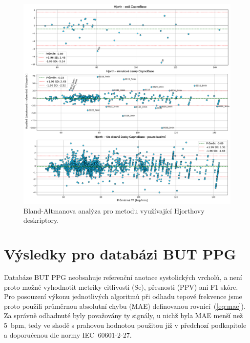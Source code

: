 \begin{figure}[!ht]
	\centering
	\includegraphics[width=1\textwidth]{./obrazky/vysledky/BlandAltman_CB_Hjorth.png}
	\caption[Bland-Altmanova analýza pro metodu využívající Hjorthovy deskriptory - CapnoBase]{Bland-Altmanova analýza pro metodu využívající Hjorthovy deskriptory.}
	\label{fig:capnobase_BlandAltman_hjorth}
\end{figure}

\FloatBarrier
\section{Výsledky pro databázi BUT PPG}
\label{sec:vysledky_butppg}
Databáze \acs{BUT PPG} neobsahuje referenční anotace systolických vrcholů, a není proto možné vyhodnotit metriky citlivosti (\acs{Se}), přesnosti (\acs{PPV}) ani F1 skóre.
Pro posouzení výkonu jednotlivých algoritmů při odhadu tepové frekvence jsme proto použili průměrnou absolutní chybu (\acs{MAE}) definovanou rovnicí~(\ref{eq:mae}).
Za správně odhadnuté byly považovány ty signály, u nichž byla \acs{MAE} menší než 5~\acs{bpm}, tedy ve shodě s prahovou hodnotou použitou již v předchozí podkapitole a doporučenou dle normy IEC~60601-2-27.

